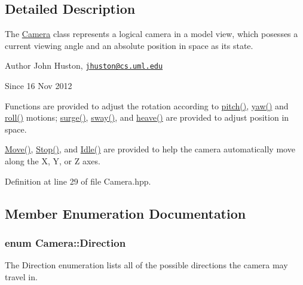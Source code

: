 \subsection{Detailed Description}
The \hyperlink{class_camera}{Camera} class represents a logical camera in a model view, which posesses a current viewing angle and an absolute position in space as its state. 

\begin{DoxyAuthor}{Author}
John Huston, \href{mailto:jhuston@cs.uml.edu}{\tt jhuston@cs.\-uml.\-edu} 
\end{DoxyAuthor}
\begin{DoxySince}{Since}
16 Nov 2012
\end{DoxySince}
Functions are provided to adjust the rotation according to \hyperlink{class_camera_ade9b499340749c916d6ffeeadd7296d4}{pitch()}, \hyperlink{class_camera_aea440eca8100cae6ffcc6ca915733795}{yaw()} and \hyperlink{class_camera_a6a0a10b821c733f380cc82aff09d9498}{roll()} motions; \hyperlink{class_camera_abb2251df65445bf8efd3fe0074fb5033}{surge()}, \hyperlink{class_camera_abbe6fe82ed05e64e35b0c4ed2001b34e}{sway()}, and \hyperlink{class_camera_a2148d751f104d8e39c9832e2372df2d9}{heave()} are provided to adjust position in space.

\hyperlink{class_camera_a421e03f93824e178d6e77ff547cd290e}{Move()}, \hyperlink{class_camera_adf064f765f610684e0675bd67de013fd}{Stop()}, and \hyperlink{class_camera_aec3559fe43597656629fdb00157d3c73}{Idle()} are provided to help the camera automatically move along the X, Y, or Z axes. 

Definition at line 29 of file Camera.\-hpp.



\subsection{Member Enumeration Documentation}
\hypertarget{class_camera_a80cb65605322d27ad3b6d973484509ec}{
\subsubsection[{Direction}]{\setlength{\rightskip}{0pt plus 5cm}enum {\bf Camera\-::\-Direction}}}\label{class_camera_a80cb65605322d27ad3b6d973484509ec}


The Direction enumeration lists all of the possible directions the camera may travel in. 

